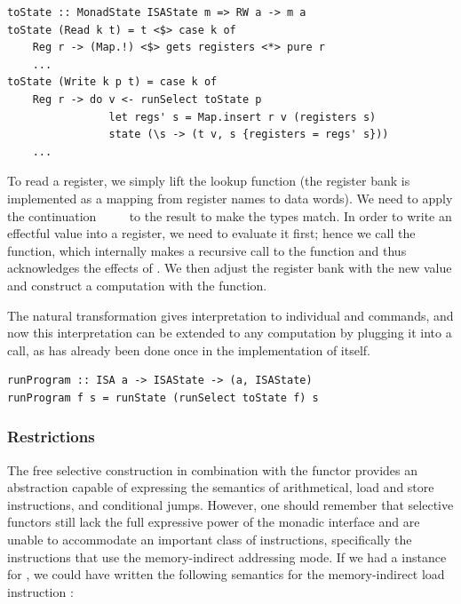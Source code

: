 \vspace{1mm}
\begin{verbatim}
toState :: MonadState ISAState m => RW a -> m a
toState (Read k t) = t <$> case k of
    Reg r -> (Map.!) <$> gets registers <*> pure r
    ...
toState (Write k p t) = case k of
    Reg r -> do v <- runSelect toState p
                let regs' s = Map.insert r v (registers s)
                state (\s -> (t v, s {registers = regs' s}))
    ...
\end{verbatim}
\vspace{1mm}

To read a register, we simply lift the  lookup function (the
register bank is implemented as a mapping from register names to data words). We need to
apply the continuation ~\hs{::}~~\hs{->}~ to the result
to make the types match. In order to write an effectful value  into a
register, we need to evaluate it first; hence we call the 
function, which internally makes a recursive call to the  function
and thus acknowledges the effects of . We then adjust the register bank
with the new value and construct a  computation with the
 function.

The natural transformation  gives interpretation to individual
 and  commands, and now this interpretation can be extended
to any  computation by plugging it into a  call, as has
already been done once in the implementation of  itself.

\vspace{1mm}
\begin{verbatim}
runProgram :: ISA a -> ISAState -> (a, ISAState)
runProgram f s = runState (runSelect toState f) s
\end{verbatim}
\vspace{1mm}

\subsubsection{Restrictions}

The free selective construction in combination with the  functor provides
an abstraction capable of expressing the semantics of arithmetical, load and
store instructions, and conditional jumps. However, one should remember that
selective functors still lack the full expressive power of the monadic interface
and are unable to accommodate an important class of instructions, specifically
the instructions that use the memory-indirect addressing mode. If we had a
 instance for , we could have written the following
semantics for the memory-indirect load instruction :

